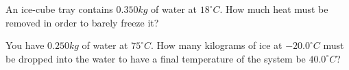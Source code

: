 \documentclass[10pt]{article}
\newenvironment{problem}[2][Problem]{\begin{trivlist}
\item[\hskip \labelsep {\bfseries #1}\hskip \labelsep {\bfseries #2.}]}{\end{trivlist}}
\begin{document}
\begin{problem}{8}
An ice-cube tray contains $0.350kg$ of water at $18^\circ C$. How much heat must be removed in order to barely freeze it?
\end{problem}

\begin{problem}{9}
You have $0.250kg$ of water at $75^\circ C$. How many kilograms of ice at $-20.0^\circ C$ must be dropped into the water to have a final temperature of the system be $40.0^\circ C$?
\end{problem}



\end{document}
